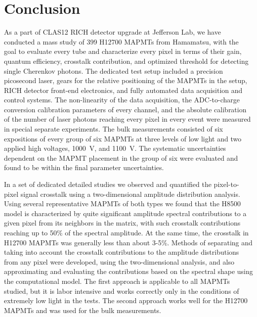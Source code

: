 \section{Conclusion}

As a part of CLAS12 RICH detector upgrade at Jefferson Lab, we have conducted a mass study of 399 H12700 MAPMTs from Hamamatsu, with the goal to evaluate every tube and characterize every pixel in terms of their gain, quantum efficiency, crosstalk contribution, and optimized threshold for detecting single Cherenkov photons. The dedicated test setup included a precision picosecond laser, gears for the relative positioning of the MAPMTs in the setup, RICH detector front-end electronics, and fully automated data acquisition and control systems. The non-linearity of the data acquisition, the ADC-to-charge conversion calibration parameters of every channel, and the absolute calibration of the number of laser photons reaching every pixel in every event were measured in special separate experiments. The bulk measurements consisted of six expositions of every group of six MAPMTs at three levels of low light and two applied high voltages, 1000~V, and 1100~V. The systematic uncertainties dependent on the MAPMT placement in the group of six were evaluated and found to be within the final parameter uncertainties.

In a set of dedicated detailed studies we observed and quantified the pixel-to-pixel signal crosstalk using a two-dimensional amplitude distribution analysis. Using several representative MAPMTs of both types we found that the H8500 model is characterized by quite significant amplitude spectral contributions to a given pixel from its neighbors in the matrix, with such crosstalk contributions reaching up to 50\% of the spectral amplitude. At the same time, the crosstalk in H12700 MAPMTs was generally less than about 3-5\%. Methods of separating and taking into account the crosstalk contributions to the amplitude distributions from any pixel were developed, using the two-dimensional analysis, and also approximating and evaluating the contributions based on the spectral shape using the computational model. The first approach is applicable to all MAPMTs studied, but it is labor intensive and works correctly only in the conditions of extremely low light in the tests. The second approach works well for the H12700 MAPMTs and was used for the bulk measurements.

